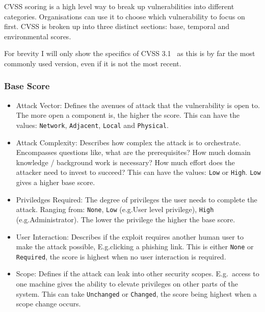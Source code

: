 \documentclass[12pt]{article}
\begin{document}
CVSS scoring is a high level way to break up vulnerabilities into different categories.
Organisations can use it to choose which vulnerability to focus on first. CVSS is broken up into
three distinct sections: base, temporal and environmental scores.

For brevity I will only show the specifics of CVSS 3.1~\cite{CVSS_31} as this is by far the most commonly used
version, even if it is not the most recent.

\subsubsection*{Base Score}

\begin{itemize}

	\item Attack Vector: Defines the avenues of attack that the vulnerability is open to. The more
	      open a component is, the higher the score. This can have the values: \texttt{Network},
	      \texttt{Adjacent}, \texttt{Local} and \texttt{Physical}.

	\item Attack Complexity: Describes how complex the attack is to orchestrate. Encompasses
	      questions like, what are the prerequisites? How much domain knowledge / background work is
	      necessary? How much effort does the attacker need to invest to succeed? This can have the
	      values: \texttt{Low} or \texttt{High}. \texttt{Low} gives a higher base score.

	\item Priviledges Required: The degree of privileges the user needs to complete the attack.
	      Ranging from: \texttt{None}, \texttt{Low} (e.g.\@ User level privilege), \texttt{High}
	      (e.g.\@ Administrator). The lower the privilege the higher the base score.

	\item User Interaction: Describes if the exploit requires another human user to make the attack
	      possible, E.g.\@ clicking a phishing link. This is either \texttt{None} or
	      \texttt{Required}, the score is highest when no user interaction is required.

	\item Scope: Defines if the attack can leak into other security scopes. E.g.\@~access to one
	      machine gives the ability to elevate privileges on other parts of the system. This can take
	      \texttt{Unchanged} or \texttt{Changed}, the score being highest when a scope change occurs.


\end{itemize}
\end{document}
